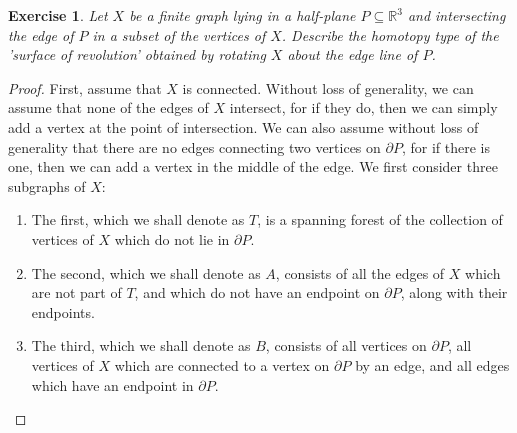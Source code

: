 \documentclass{article}
\newtheorem{exercise}[theorem]{Exercise}
\begin{document}
\begin{exercise}
Let $X$ be a finite graph lying in a half-plane $P\subseteq \mathbb{R}^3$ and intersecting the edge of $P$ in a subset of the vertices of $X$. Describe the homotopy type of the 'surface of revolution' obtained by rotating $X$ about the edge line of $P$.
\end{exercise}
\begin{proof}
First, assume that $X$ is connected. Without loss of generality, we can assume that none of the edges of $X$ intersect, for if they do, then we can simply add a vertex at the point of intersection. We can also assume without loss of generality that there are no edges connecting two vertices on $\partial P$, for if there is one, then we can add a vertex in the middle of the edge. We first consider three subgraphs of $X$:
\begin{enumerate}
\item The first, which we shall denote as $T$, is a spanning forest of the collection of vertices of $X$ which do not lie in $\partial P$.
\item The second, which we shall denote as $A$, consists of all the edges of $X$ which are not part of $T$, and which do not have an endpoint on $\partial P$, along with their endpoints.
\item The third, which we shall denote as $B$, consists of all vertices on $\partial P$, all vertices of $X$ which are connected to a vertex on $\partial P$ by an edge, and all edges which have an endpoint in $\partial P$.

\end{enumerate}
\end{proof}
\end{document}
